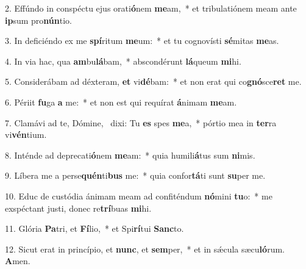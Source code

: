 2. Effúndo in conspéctu ejus orati\textbf{ó}nem \textbf{me}am,~*  et tribulatiónem meam ante \textbf{ip}sum pro\textbf{nún}tio.\

3. In deficiéndo ex me \textbf{spí}ritum \textbf{me}um:~*  et tu cognovísti \textbf{sé}mitas \textbf{me}as.\

4. In via hac, qua \textbf{am}bu\textbf{lá}bam,~*  abscondérunt \textbf{lá}queum \textbf{mi}hi.\

5. Considerábam ad déxteram, \textbf{et} vi\textbf{dé}bam:~*  et non erat qui co\textbf{gnó}sce\textbf{ret} me.\

6. Périit \textbf{fu}ga \textbf{a} me:~*  et non est qui requírat \textbf{á}nimam \textbf{me}am.\

7. Clamávi ad te, Dómine, \dag\  dixi: Tu \textbf{es} spes \textbf{me}a,~*  pórtio mea in \textbf{ter}ra vi\textbf{vén}tium.\

8. Inténde ad deprecati\textbf{ó}nem \textbf{me}am:~*  quia humili\textbf{á}tus sum \textbf{ni}mis.\

9. Líbera me a perse\textbf{quén}ti\textbf{bus} me:~*  quia confor\textbf{tá}ti sunt \textbf{su}per me.\

10. Educ de custódia ánimam meam ad confiténdum \textbf{nó}mini \textbf{tu}o:~*  me exspéctant justi, donec re\textbf{trí}buas \textbf{mi}hi.\

11. Glória \textbf{Pa}tri, et \textbf{Fí}lio,~*  et Spi\textbf{rí}tui \textbf{Sanc}to.\

12. Sicut erat in princípio, et \textbf{nunc}, et \textbf{sem}per,~*  et in sǽcula sæcu\textbf{ló}rum. \textbf{A}men.\

